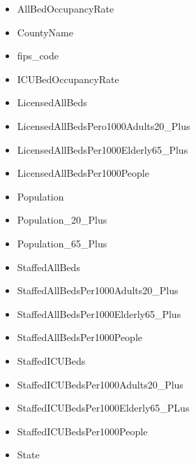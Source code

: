\documentclass[11pt]{article}
\begin{document}
\begin{itemize}
    \item AllBedOccupancyRate
    \item CountyName
    \item fips\_code
    \item ICUBedOccupancyRate
    \item LicensedAllBeds
    \item LicensedAllBedsPero1000Adults20\_Plus
    \item LicensedAllBedsPer1000Elderly65\_Plus
    \item LicensedAllBedsPer1000People
    \item Population
    \item Population\_20\_Plus
    \item Population\_65\_Plus
    \item StaffedAllBeds
    \item StaffedAllBedsPer1000Adults20\_Plus
    \item StaffedAllBedsPer1000Elderly65\_Plus
    \item StaffedAllBedsPer1000People
    \item StaffedICUBeds
    \item StaffedICUBedsPer1000Adults20\_Plus
    \item StaffedICUBedsPer1000Elderly65\_PLus
    \item StaffedICUBedsPer1000People
    \item State
\end{itemize}


\end{document}
